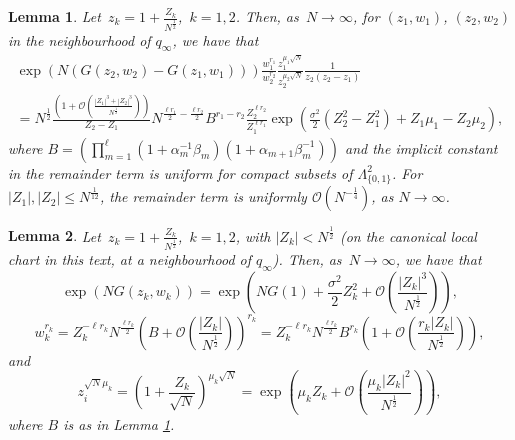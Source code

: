\documentclass[10pt,a4paper]{amsart}
\newtheorem{lemma}{Lemma}
\begin{document}
\begin{lemma}\label{lemma:local_action_function}
Let~$z_k=1+\frac{Z_k}{N^\frac{1}{2}}$,~$k=1,2$. Then, as~$N\to \infty$, for $(z_1,w_1)$,  $(z_2,w_2)$ in the neighbourhood of $q_{\infty}$, we have that
\begin{multline} \label{eqn:integrand_near_q_infinity}
\exp\left({N(G(z_2,w_2)-G(z_1,w_1))}\right)
\frac{w_1^{r_1}}{w_2^{r_2}}
 \frac{z_1^{\mu_1\sqrt{N}}}{z_2^{\mu_2\sqrt{N}}}
 \frac{1}{z_2(z_2-z_1)}
\\= N^{\frac{1}{2}} \frac{\left(1+\mathcal{O}\left( \frac{|Z_1|^3+|Z_2|^3}{N^{\frac{1}{2}}} \right)\right)}{Z_2-Z_1} 
 N^{\frac{\ell r_1}{2}-\frac{\ell r_2}{2}} 
B^{ r_1- r_2} 
\frac{Z_2^{\ell r_2}}{Z_1^{\ell r_1}}
\exp\left(\frac{\sigma^2}{2}(Z_2^2-Z_1^2)+Z_1\mu_1-Z_2\mu_2\right),
\end{multline}
where $B=\left(\prod_{m=1}^\ell(1+\alpha_m^{-1}\beta_m)(1+\alpha_{m+1}\beta_m^{-1})\right)$ and the implicit constant in the remainder term is uniform for compact subsets of $\Lambda_{\{0,1\}}^2$. 
 For $|Z_1|, |Z_2| \leq N^{\frac{1}{12}}$, the remainder term
 is uniformly $\mathcal{O}(N^{-\frac{1}{4}})$, as $N\rightarrow\infty$.
\end{lemma}

\begin{lemma}\label{lemma:expansions}
Let~$z_k=1+\frac{Z_k}{N^\frac{1}{2}}$,~$k=1,2$, with $|Z_k|< N^{\frac{1}{2}}$ (on the canonical local chart in this text, at a neighbourhood of $q_{\infty}$). Then, as~$N\to \infty$, we have that
\begin{equation} \label{eqn:local_action_contribution}
\exp(NG(z_k,w_k))= \exp\left(NG(1)+\frac{\sigma^2}{2}Z_k^2+\mathcal{O}\left(\frac{|Z_k|^3}{N^{\frac{1}{2}}}\right)\right),
\end{equation}
\begin{equation} \label{eqn:local_w_contribution}
w_k^{r_k}=
Z_k^{-\ell r_k} 
N^{\frac{\ell r_k}{2}} 
\left(B+\mathcal{O}\left(\frac{|Z_k|}{N^{\frac{1}{2}}}\right)\right)^{r_k}
=
Z_k^{-\ell r_k} 
N^{\frac{\ell r_k}{2}} 
B^{r_k}\left(1+\mathcal{O}\left(\frac{r_k |Z_k|}{N^{\frac{1}{2}}}\right)\right),
\end{equation}
and
\begin{equation} \label{eqn:local_z_contribution}
z_i^{\sqrt{N}\mu_k}=\left(1+\frac{Z_k}{ \sqrt{N}}\right)^{\mu_k\sqrt{N}}=\exp\left(\mu_k Z_k+\mathcal{O}\left(\frac{\mu_k |Z_k|^2}{N^{\frac{1}{2}}}\right)\right),
\end{equation}
where $B$ is as in Lemma \ref{lemma:local_action_function}.
\end{lemma}
\end{document}

